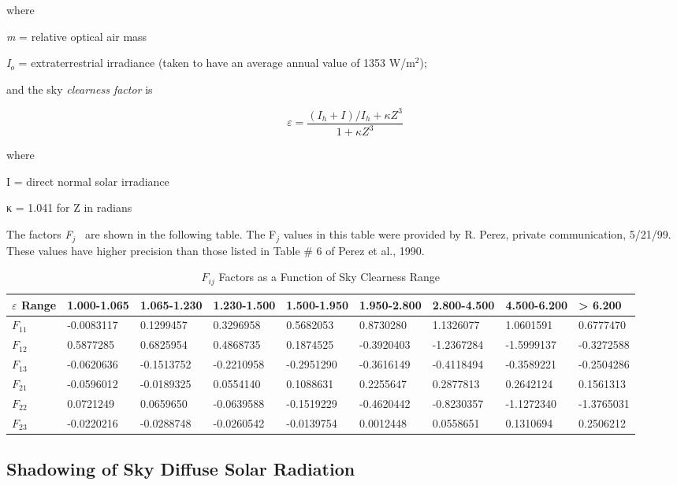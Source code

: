 where

\emph{m} = relative optical air mass

\emph{I\(_{o}\)} = extraterrestrial irradiance (taken to have an average annual value of 1353 W/m\(^{2}\));

and the sky \emph{clearness factor} is

\begin{equation}
\varepsilon  = \frac{{({I_h} + I)/{I_h} + \kappa {Z^3}}}{{1 + \kappa {Z^3}}}
\end{equation}

where

I = direct normal solar irradiance

κ = 1.041 for Z in radians

The factors \emph{F\(_{j}\)} ~are shown in the following table. The F\(_{j}\) values in this table were provided by R. Perez, private communication, 5/21/99. These values have higher precision than those listed in Table \# 6 of Perez et al., 1990.

\fontsize{8}{9.6}\selectfont
\begin{longtable}[c]{p{0.4in}p{0.6in}p{0.6in}p{0.6in}p{0.6in}p{0.6in}p{0.6in}p{0.6in}p{0.6in}}
\caption{$F_{ij}$ Factors as a Function of Sky Clearness Range \label{table:fij-factors-as-a-function-of-sky-clearness}}\\
\toprule 
$\varepsilon$ Range & 1.000-1.065 & 1.065-1.230 & 1.230-1.500 & 1.500-1.950 & 1.950-2.800 & 2.800-4.500 & 4.500-6.200 & >  6.200 \tabularnewline \midrule
$F_{11}$ & -0.0083117 & 0.1299457 & 0.3296958 & 0.5682053 & 0.8730280 & 1.1326077 & 1.0601591 & 0.6777470 \tabularnewline \midrule
$F_{12}$ & 0.5877285 & 0.6825954 & 0.4868735 & 0.1874525 & -0.3920403 & -1.2367284 & -1.5999137 & -0.3272588 \tabularnewline \midrule
$F_{13}$ & -0.0620636 & -0.1513752 & -0.2210958 & -0.2951290 & -0.3616149 & -0.4118494 & -0.3589221 & -0.2504286 \tabularnewline \midrule
$F_{21}$ & -0.0596012 & -0.0189325 & 0.0554140 & 0.1088631 & 0.2255647 & 0.2877813 & 0.2642124 & 0.1561313 \tabularnewline \midrule
$F_{22}$ & 0.0721249 & 0.0659650 & -0.0639588 & -0.1519229 & -0.4620442 & -0.8230357 & -1.1272340 & -1.3765031 \tabularnewline \midrule
$F_{23}$ & -0.0220216 & -0.0288748 & -0.0260542 & -0.0139754 & 0.0012448 & 0.0558651 & 0.1310694 & 0.2506212 \tabularnewline \midrule
\bottomrule
\end{longtable}
\normalsize

\subsection{Shadowing of Sky Diffuse Solar Radiation}\label{shadowing-of-sky-diffuse-solar-radiation}


